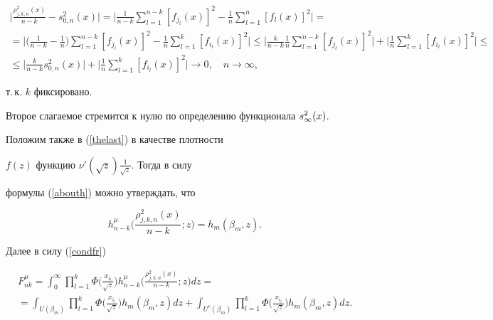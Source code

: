 \begin{gather*}


\bigg|\frac{\rho^2_{j,k,n}(x)}{n-k}-s^2_{0,n}(x)\bigg|=


\bigg|\frac1{n-k}\sum\limits_{l=1}^{n-k}


[f_{j_l}(x)]^2-\frac1n\sum\limits_{l=1}^n[f_l(x)]^2\bigg|= \\


%


=\bigg|\bigg(\frac1{n-k}-\frac1n\bigg)\sum\limits_{l=1}^{n-k}


[f_{j_l}(x)]^2-\frac1n\sum\limits_{l=1}^k[f_{i_l}(x)]^2\bigg|\le 


\bigg|\frac{k}{n-k}\frac1n\sum\limits_{l=1}^{n-k}


[f_{j_l}(x)]^2\bigg|+\bigg|\frac1n\sum\limits_{l=1}^k[f_{i_l}(x)]^2\bigg|


\le \\


%


\le\bigg|\frac{k}{n-k}s^2_{0,n}(x)\bigg|+


\bigg|\frac1n\sum\limits_{l=1}^k[f_{i_l}(x)]^2\bigg|\to0,\quad n\to\infty,


\end{gather*}


т.\,к. $k$ фиксировано.


Второе слагаемое стремится к нулю по определению функционала $s^2_\infty(x)$.





Положим также в (\ref{thelast}) в качестве плотности


$f(z)$ функцию $\nu'(\sqrt{z})\frac1{\sqrt{z}}$. Тогда в силу


формулы (\ref{abouth}) можно утверждать, что


$$


h_{n-k}^\mu\bigg(\frac{\rho^2_{j,k,n}(x)}{n-k};z\bigg)=h_m(\beta_m,z).


$$


Далее в силу (\ref{condfr})


\begin{multline*}


F^\mu_{nk}=\int_0^\infty\prod_{l=1}^k\Phi\bigg(\frac{x_{i_l}}{\sqrt{z}}\bigg)


h_{n-k}^\mu\bigg(\frac{\rho^2_{j,k,n}(x)}{n-k};z\bigg)dz= \\


%


=\int_{U(\beta_m)}\prod_{l=1}^k\Phi\bigg(\frac{x_{i_l}}


{\sqrt{z}}\bigg)h_m(\beta_m,z)dz+\int_{U^c(\beta_m)}


\prod_{l=1}^k\Phi\bigg(\frac{x_{i_l}}{\sqrt{z}}\bigg)h_m(\beta_m,z)dz.


\end{multline*}


